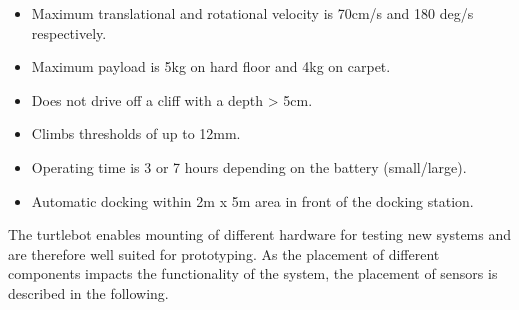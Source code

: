     \begin{itemize}
    	\item Maximum translational and rotational velocity is 70cm/s and 180 deg/s respectively.
    	\item Maximum payload is 5kg on hard floor and 4kg on carpet.
    	\item Does not drive off a cliff with a depth > 5cm.
    	\item Climbs thresholds of up to 12mm.
    	\item Operating time is 3 or 7 hours depending on the battery (small/large).
    	\item Automatic docking within 2m x 5m area in front of the docking station.
    \end{itemize}


The turtlebot enables mounting of different hardware for testing new systems and are therefore well suited for prototyping. As the placement of different components impacts the functionality of the system, the placement of sensors is described in the following.